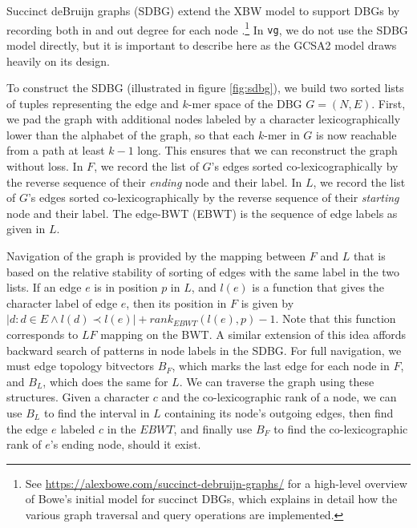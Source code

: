 Succinct deBruijn graphs (SDBG) extend the XBW model to support DBGs by recording both in and out degree for each node \cite{bowe2012succinct,muggli2017succinct}.\footnote{See \url{https://alexbowe.com/succinct-debruijn-graphs/} for a high-level overview of Bowe's initial model for succinct DBGs, which explains in detail how the various graph traversal and query operations are implemented.}
In {\tt vg}, we do not use the SDBG model directly, but it is important to describe here as the GCSA2 model draws heavily on its design.

To construct the SDBG (illustrated in figure \ref{fig:sdbg}), we build two sorted lists of tuples representing the edge and $k$-mer space of the DBG $G = (N, E)$.
First, we pad the graph with additional nodes labeled by a character lexicographically lower than the alphabet of the graph, so that each $k$-mer in $G$ is now reachable from a path at least $k-1$ long.
This ensures that we can reconstruct the graph without loss.
In $F$, we record the list of $G$'s edges sorted co-lexicographically by the reverse sequence of their \emph{ending} node and their label.
In $L$, we record the list of $G$'s edges sorted co-lexicographically by the reverse sequence of their \emph{starting} node and their label.
The edge-BWT (EBWT) is the sequence of edge labels as given in $L$.

Navigation of the graph is provided by the mapping between $F$ and $L$ that is based on the relative stability of sorting of edges with the same label in the two lists.
If an edge $e$ is in position $p$ in $L$, and $l(e)$ is a function that gives the character label of edge $e$, then its position in $F$ is given by $|{d : d \in E \land l(d) \prec l(e)}| + rank_{EBWT}(l(e), p) - 1$.
Note that this function corresponds to $LF$ mapping on the BWT.
A similar extension of this idea affords backward search of patterns in node labels in the SDBG.
For full navigation, we must edge topology bitvectors $B_F$, which marks the last edge for each node in $F$, and $B_L$, which does the same for $L$.
We can traverse the graph using these structures.
Given a character $c$ and the co-lexicographic rank of a node, we can use $B_L$ to find the interval in $L$ containing its node's outgoing edges, then find the edge $e$ labeled $c$ in the $EBWT$, and finally use $B_F$ to find the co-lexicographic rank of $e$'s ending node, should it exist.

